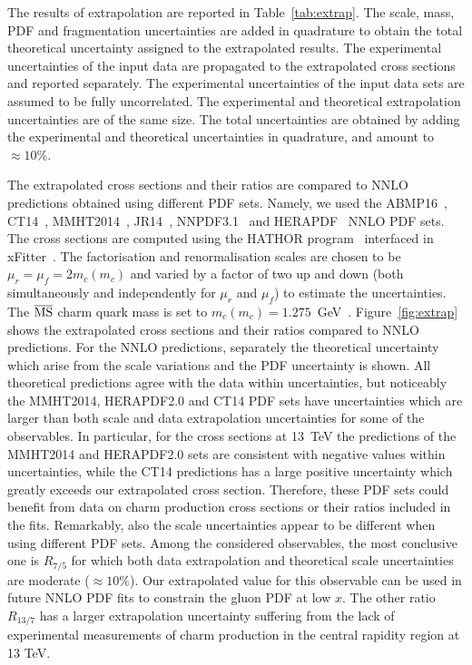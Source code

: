 \documentclass[12pt,a4paper]{article}
\newcommand{\msbar}{\ensuremath{\overline{\rm MS}}\xspace}
\begin{document}
The results of extrapolation are reported in Table~\ref{tab:extrap}. The scale, mass, PDF and fragmentation uncertainties are added in quadrature to obtain the total theoretical uncertainty assigned to the extrapolated results. The experimental uncertainties of the input data are propagated to the extrapolated cross sections and reported separately. The experimental uncertainties of the input data sets are assumed to be fully uncorrelated. %
The experimental and theoretical extrapolation uncertainties are of the same size. The total uncertainties are obtained by adding the experimental and theoretical uncertainties in quadrature, and amount to $\approx 10\%$.

The extrapolated cross sections and their ratios are compared to NNLO predictions obtained using different PDF sets. Namely, we used the ABMP16~\cite{Alekhin:2017kpj}, CT14~\cite{Dulat:2015mca}, MMHT2014~\cite{Harland-Lang:2014zoa}, JR14~\cite{Jimenez-Delgado:2014twa}, NNPDF3.1~\cite{Ball:2017nwa} and HERAPDF~\cite{Abramowicz:2015mha} NNLO PDF sets. The cross sections are computed using the HATHOR program~\cite{Aliev:2010zk} interfaced in xFitter~\cite{Alekhin:2014irh}.  The factorisation and renormalisation scales are chosen to be $\mu_r = \mu_f = 2m_c(m_c)$ and varied by a factor of two up and down (both simultaneously and independently for $\mu_r$ and $\mu_f$) to estimate the uncertainties. The \msbar charm quark mass is set to $m_c(m_c) = 1.275$~GeV~\cite{Tanabashi:2018oca}. Figure~\ref{fig:extrap} shows the extrapolated cross sections and their ratios compared to NNLO predictions. For the NNLO predictions, separately the theoretical uncertainty which arise from the scale variations and the PDF uncertainty is shown. All theoretical predictions agree with the data within uncertainties, but noticeably the MMHT2014, HERAPDF2.0 and CT14 PDF sets have uncertainties which are larger than both scale and data extrapolation uncertainties for some of the observables. In particular, for the cross sections at 13~TeV the predictions of the MMHT2014 and HERAPDF2.0 sets are consistent with negative values within uncertainties, while the CT14 predictions has a large positive uncertainty which greatly exceeds our extrapolated cross section. Therefore, these PDF sets could benefit from data on charm production cross sections or their ratios included in the fits. Remarkably, also the scale uncertainties appear to be different when using different PDF sets. Among the considered observables, the most conclusive one is $R_{7/5}$ for which both data extrapolation and theoretical scale uncertainties are moderate ($\approx 10\%$). Our extrapolated value for this observable can be used in future NNLO PDF fits to constrain the gluon PDF at low $x$. The other ratio $R_{13/7}$ has a larger extrapolation uncertainty suffering from the lack of experimental measurements of charm production in the central rapidity region at 13 TeV.
\end{document}
